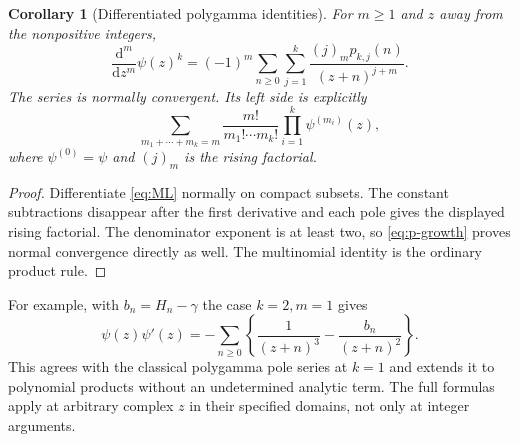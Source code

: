 \documentclass[11pt,a4paper]{article}
\numberwithin{equation}{section}
\newtheorem{corollary}[theorem]{Corollary}
\theoremstyle{definition}
\theoremstyle{remark}
\newcommand{\dd}{\mathrm d}
\begin{document}
\begin{corollary}[Differentiated polygamma identities]
\label{cor:derivatives}
For $m\ge1$ and $z$ away from the nonpositive integers,
\begin{equation}
 \frac{\dd^m}{\dd z^m}\psi(z)^k
  =(-1)^m\sum_{n\ge0}\sum_{j=1}^k
              \frac{(j)_m p_{k,j}(n)}{(z+n)^{j+m}}.
 \label{eq:all-derivatives}
\end{equation}
The series is normally convergent.  Its left side is explicitly
\begin{equation}
 \sum_{m_1+\cdots+m_k=m}
          \frac{m!}{m_1!\cdots m_k!}
                         \prod_{i=1}^k\psi^{(m_i)}(z),
 \label{eq:polygamma-multinomial}
\end{equation}
where $\psi^{(0)}=\psi$ and $(j)_m$ is the rising factorial.
\end{corollary}

\begin{proof}
Differentiate \eqref{eq:ML} normally on compact subsets.  The constant
subtractions disappear after the first derivative and each pole gives
the displayed rising factorial.  The denominator exponent is at least
two, so \eqref{eq:p-growth} proves normal convergence directly as well.
The multinomial identity is the ordinary product rule.
\end{proof}

For example, with $b_n=H_n-\gamma$ the case $k=2,m=1$ gives
\[
 \psi(z)\psi'(z)
     =-\sum_{n\ge0}\left\{\frac1{(z+n)^3}
                             -\frac{b_n}{(z+n)^2}\right\}.
\]
This agrees with the classical polygamma pole series at $k=1$ and
extends it to polynomial products without an undetermined analytic
term.  The full formulas apply at arbitrary complex $z$ in their
specified domains, not only at integer arguments.

\end{document}
